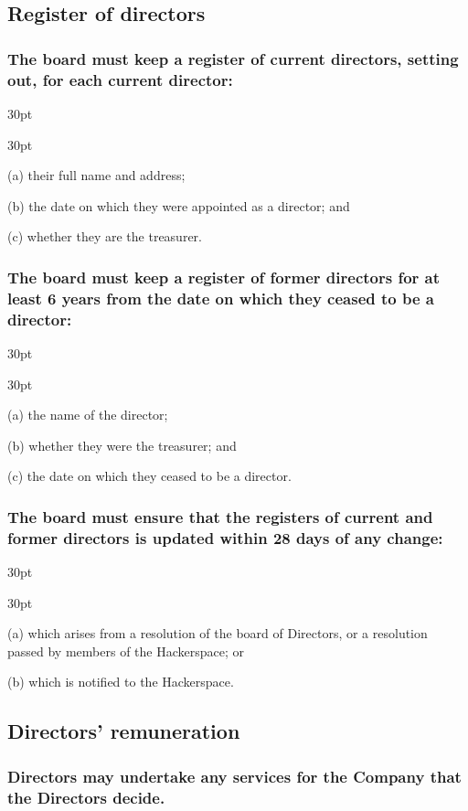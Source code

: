 \documentclass[12pt]{article}
\def\clauseindent{30pt}
\newenvironment{subindentlist}{\begin{adjustwidth}{\clauseindent}{}\begin{labeledlist}{\clauseindent}}{\end{labeledlist}\end{adjustwidth}}
\begin{document}
\subsection{Register of directors}
\subsubsection{The board must keep a register of current directors, setting out, for each current director:}
\begin{subindentlist}
    \item [(a)] their full name and address;
    \item [(b)] the date on which they were appointed as a director; and
    \item [(c)] whether they are the treasurer.
\end{subindentlist}
\subsubsection{The board must keep a register of former directors for at least 6 years from the date on which they ceased to be a director:}
\begin{subindentlist}
    \item [(a)] the name of the director;
    \item [(b)] whether they were the treasurer; and
    \item [(c)] the date on which they ceased to be a director.
\end{subindentlist}
\subsubsection{The board must ensure that the registers of current and former directors is updated within 28 days of any change:}
\begin{subindentlist}
    \item [(a)] which arises from a resolution of the board of Directors, or a resolution passed by members of the Hackerspace; or
    \item [(b)] which is notified to the Hackerspace.
\end{subindentlist}

\subsection{Directors' remuneration}
\subsubsection{Directors may undertake any services for the Company that the Directors decide.}
\end{document}
